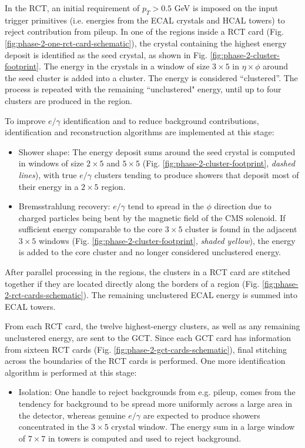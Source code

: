 In the RCT, an initial requirement of $p_{T} > 0.5$ GeV is imposed on the input trigger primitives (i.e. energies from the ECAL crystals and HCAL towers) to reject contribution from pileup. In one of the regions inside a RCT card (Fig. \ref{fig:phase-2-one-rct-card-schematic}), the crystal containing the highest energy deposit is identified as the seed crystal, as shown in Fig. \ref{fig:phase-2-cluster-footprint}. The energy in the crystals in a window of size $3\times 5$ in $\eta\times\phi$ around the seed cluster is added into a cluster. The energy is considered ``clustered''. The process is repeated with the remaining ``unclustered" energy, until up to four clusters are produced in the region. 


To improve $e/\gamma$ identification and to reduce background contributions, identification and reconstruction algorithms are implemented at this stage:
\begin{itemize}
    \item Shower shape: The energy deposit sums around the seed crystal is computed in windows of size $2 \times 5$ and $5 \times 5$ (Fig. \ref{fig:phase-2-cluster-footprint}, \textit{dashed lines}), with true $e/\gamma$ clusters tending to produce showers that deposit most of their energy in a $2 \times 5$ region. 
    \item Bremsstrahlung recovery: $e/\gamma$ tend to spread in the $\phi$ direction due to charged particles being bent by the magnetic field of the CMS solenoid. If sufficient energy comparable to the core $3 \times 5$ cluster is found in the adjacent $3 \times 5$ windows (Fig. \ref{fig:phase-2-cluster-footprint}, \textit{shaded yellow}), the energy is added to the core cluster and no longer considered unclustered energy.
\end{itemize}

After parallel processing in the regions, the clusters in a RCT card are stitched together if they are located directly along the borders of a region (Fig. \ref{fig:phase-2-rct-cards-schematic}). The remaining unclustered ECAL energy is summed into ECAL towers. 

From each RCT card, the twelve highest-energy clusters, as well as any remaining unclustered energy, are sent to the GCT. Since each GCT card has information from sixteen RCT cards (Fig. \ref{fig:phase-2-gct-cards-schematic}), final stitching across the boundaries of the RCT cards is performed. One more identification algorithm is performed at this stage:
\begin{itemize}
    \item Isolation: One handle to reject backgrounds from e.g. pileup, comes from the tendency for background to be spread more uniformly across a large area in the detector, whereas genuine $e/\gamma$ are expected to produce showers concentrated in the $3 \times 5$ crystal window. The energy sum in a large window of $7 \times 7$ in towers is computed and used to reject background.
\end{itemize}

